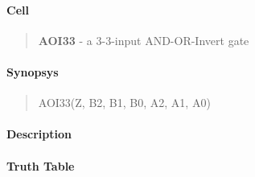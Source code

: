 \label{AOI33}
\paragraph{Cell}
\begin{quote}
    \textbf{AOI33} - a 3-3-input AND-OR-Invert gate
\end{quote}

\paragraph{Synopsys}
\begin{quote}
    AOI33(Z, B2, B1, B0, A2, A1, A0)
\end{quote}

\paragraph{Description}

%

\paragraph{Truth Table}


